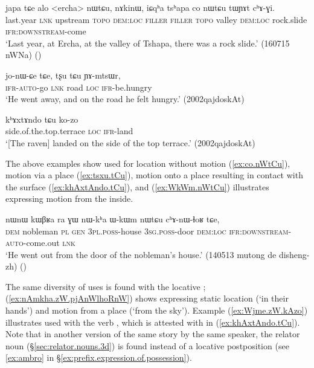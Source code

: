 \begin{exe}
\ex \label{ex:co.nWtCu}
\gll japa tɕe alo <ercha> nɯtɕu, nɤkinɯ, iɕqʰa tsʰapa co nɯtɕu tɯɲɤt cʰɤ-ɣi. \\
last.year \textsc{lnk} upstream  \textsc{topo} \textsc{dem}:\textsc{loc} \textsc{filler}   \textsc{filler}   \textsc{topo} valley \textsc{dem}:\textsc{loc} rock.slide \textsc{ifr}:\textsc{downstream}-come \\
\glt `Last year, at Ercha, at the valley of Tshapa, there was a rock slide.' (160715 nWNa)
()
\end{exe}

\begin{exe}
\ex \label{ex:tsxu.tCu}
\gll jo-nɯ-ɕe tɕe, tʂu tɕu ɲɤ-mtsɯr, \\
\textsc{ifr}-\textsc{auto}-go \textsc{lnk} road \textsc{loc} \textsc{ifr}-be.hungry \\
\glt `He went away, and on the road he felt hungry.' (2002qajdoskAt)
\end{exe}

\begin{exe}
\ex \label{ex:khAxtAndo.tCu}
\gll  kʰɤxtɤndo tɕu ko-zo \\
side.of.the.top.terrace \textsc{loc} \textsc{ifr}-land \\
\glt `[The raven] landed on the side of the top terrace.' (2002qajdoskAt)
\end{exe}

The above examples show  used for location without motion (\ref{ex:co.nWtCu}), motion via a place (\ref{ex:tsxu.tCu}), motion onto a place resulting in contact with the surface (\ref{ex:khAxtAndo.tCu}), and (\ref{ex:WkWm.nWtCu}) illustrates  expressing motion from the inside.

\begin{exe}
\ex \label{ex:WkWm.nWtCu}
\gll nɯnɯ kɯβʁa ra ɣɯ nɯ-kʰa ɯ-kɯm nɯtɕu cʰɤ-nɯ-ɬoʁ tɕe, \\
\textsc{dem} nobleman \textsc{pl} \textsc{gen} \textsc{3pl}.\textsc{poss}-house \textsc{3sg}.\textsc{poss}-door \textsc{dem}:\textsc{loc} \textsc{ifr}:\textsc{downstream}-\textsc{auto}-come.out \textsc{lnk} \\
\glt  `He went out from the door of the nobleman's house.' (140513 mutong de disheng-zh)
()
\end{exe}

The same diversity of uses is found with the locative ; (\ref{ex:nAmkha.zW.pjAnWlhoRnW}) shows  expressing static location (`in their hands') and motion from a place (`from the sky').  Example (\ref{ex:Wjme.zW.kAzo}) illustrates  used with the verb , which is attested with  in (\ref{ex:khAxtAndo.tCu}). Note that in another version of the same story by the same speaker, the relator noun  (§\ref{sec:relator.nouns.3d}) is found instead of a locative postposition (see \ref{ex:ambro} in §\ref{ex:prefix.expression.of.possession}).

